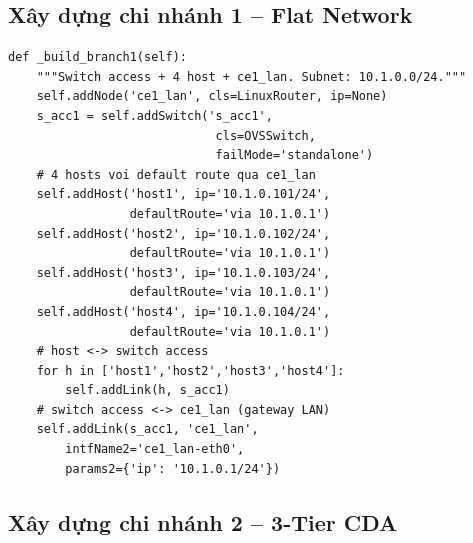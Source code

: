 \subsection{Xây dựng chi nhánh 1 -- Flat Network}

\begin{lstlisting}[style=pythonstyle, caption={Hàm \_build\_branch1() -- Flat Network}]
def _build_branch1(self):
    """Switch access + 4 host + ce1_lan. Subnet: 10.1.0.0/24."""
    self.addNode('ce1_lan', cls=LinuxRouter, ip=None)
    s_acc1 = self.addSwitch('s_acc1',
                             cls=OVSSwitch,
                             failMode='standalone')
    # 4 hosts voi default route qua ce1_lan
    self.addHost('host1', ip='10.1.0.101/24',
                 defaultRoute='via 10.1.0.1')
    self.addHost('host2', ip='10.1.0.102/24',
                 defaultRoute='via 10.1.0.1')
    self.addHost('host3', ip='10.1.0.103/24',
                 defaultRoute='via 10.1.0.1')
    self.addHost('host4', ip='10.1.0.104/24',
                 defaultRoute='via 10.1.0.1')
    # host <-> switch access
    for h in ['host1','host2','host3','host4']:
        self.addLink(h, s_acc1)
    # switch access <-> ce1_lan (gateway LAN)
    self.addLink(s_acc1, 'ce1_lan',
        intfName2='ce1_lan-eth0',
        params2={'ip': '10.1.0.1/24'})
\end{lstlisting}

\subsection{Xây dựng chi nhánh 2 -- 3-Tier CDA}

